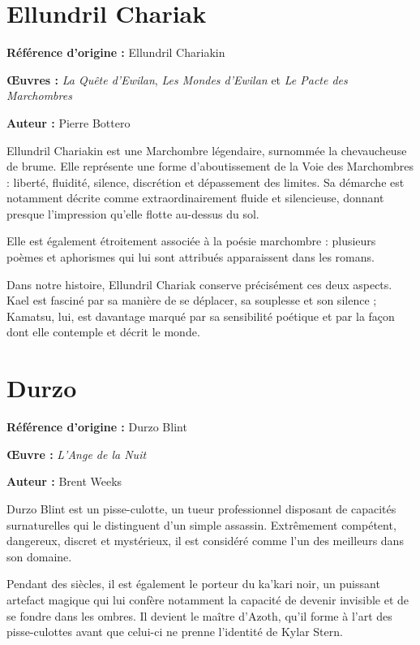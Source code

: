 \section*{Ellundril Chariak}

\textbf{Référence d'origine :} Ellundril Chariakin

\textbf{Œuvres :} \textit{La Quête d'Ewilan}, \textit{Les Mondes d'Ewilan}
et \textit{Le Pacte des Marchombres}

\textbf{Auteur :} Pierre Bottero

Ellundril Chariakin est une Marchombre légendaire, surnommée la chevaucheuse
de brume. Elle représente une forme d'aboutissement de la Voie des
Marchombres : liberté, fluidité, silence, discrétion et dépassement des
limites. Sa démarche est notamment décrite comme extraordinairement fluide et
silencieuse, donnant presque l'impression qu'elle flotte au-dessus du sol.

Elle est également étroitement associée à la poésie marchombre : plusieurs
poèmes et aphorismes qui lui sont attribués apparaissent dans les romans.

Dans notre histoire, Ellundril Chariak conserve précisément ces deux aspects.
Kael est fasciné par sa manière de se déplacer, sa souplesse et son silence ;
Kamatsu, lui, est davantage marqué par sa sensibilité poétique et par la façon
dont elle contemple et décrit le monde.

\section*{Durzo}

\textbf{Référence d'origine :} Durzo Blint

\textbf{Œuvre :} \textit{L'Ange de la Nuit}

\textbf{Auteur :} Brent Weeks

Durzo Blint est un pisse-culotte, un tueur professionnel disposant de
capacités surnaturelles qui le distinguent d'un simple assassin. Extrêmement
compétent, dangereux, discret et mystérieux, il est considéré comme l'un des
meilleurs dans son domaine.

Pendant des siècles, il est également le porteur du ka'kari noir, un puissant
artefact magique qui lui confère notamment la capacité de devenir invisible
et de se fondre dans les ombres. Il devient le maître d'Azoth, qu'il forme à
l'art des pisse-culottes avant que celui-ci ne prenne l'identité de Kylar
Stern.

